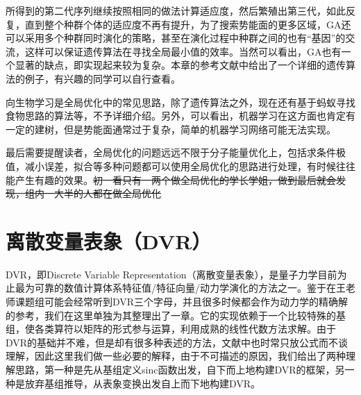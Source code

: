 \documentclass[12pt,a4paper,openany,twoside]{book}
\numberwithin{equation}{section}
\begin{document}
        所得到的第二代序列继续按照相同的做法计算适应度，然后繁殖出第三代，如此反复，直到整个种群个体的适应度不再有提升，为了搜索势能面的更多区域，GA还可以采用多个种群同时演化的策略，甚至在演化过程中种群之间的也有“基因”的交流，这样可以保证遗传算法在寻找全局最小值的效率。当然可以看出，GA也有一个显著的缺点，即实现起来较为复杂。本章的参考文献中给出了一个详细的遗传算法的例子，有兴趣的同学可以自行查看。

        向生物学习是全局优化中的常见思路，除了遗传算法之外，现在还有基于蚂蚁寻找食物思路的算法等，不予详细介绍。另外，可以看出，机器学习在这方面也肯定有一定的建树，但是势能面通常过于复杂，简单的机器学习网络可能无法实现。

        最后需要提醒读者，全局优化的问题远远不限于分子能量优化上，包括求条件极值，减小误差，拟合等多种问题都可以使用全局优化的思路进行处理，有时候往往能产生有趣的效果。\sout{初一看只有一两个做全局优化的学长学姐，做到最后就会发现，组内一大半的人都在做全局优化}


    \chapter{离散变量表象（DVR）}
     
      DVR，即Discrete Variable Representation（离散变量表象），是量子力学目前为止最为可靠的数值计算体系特征值/特征向量/动力学演化的方法之一。鉴于在王老师课题组可能会经常听到DVR三个字母，并且很多时候都会作为动力学的精确解的参考，我们在这里单独为其整理出了一章。它的实现依赖于一个比较特殊的基组，使各类算符以矩阵的形式参与运算，利用成熟的线性代数方法求解。由于DVR的基础并不难，但是却有很多种表述的方法，文献中也时常只放公式而不谈理解，因此这里我们做一些必要的解释，由于不可描述的原因，我们给出了两种理解思路，第一种是先从基组定义sinc函数出发，自下而上地构建DVR的框架，另一种是放弃基组推导，从表象变换出发自上而下地构建DVR。 
\end{document}
